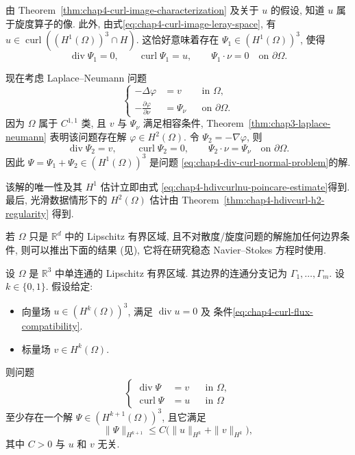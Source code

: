 \begin{Proof}
由 Theorem~\ref{thm:chap4-curl-image-characterization} 及关于 $u$ 的假设,
知道 $u$ 属于旋度算子的像. 此外, 由式\eqref{eq:chap4-curl-image-leray-space},
有 $u\in\operatorname{curl}((H^1(\Omega))^3\cap H)$. 这恰好意味着存在
$\Psi_1\in(H^1(\Omega))^3$, 使得
\[
\operatorname{div}\Psi_1=0,\qquad
\operatorname{curl}\Psi_1=u,\qquad
 \Psi_1\cdot\nu=0\quad\text{on }\partial\Omega.
\]

现在考虑 Laplace--Neumann 问题
\[
\left\{
\begin{aligned}
 -\Delta\varphi&=v&&\text{in }\Omega,\\
 -\frac{\partial\varphi}{\partial\nu}&=\Psi_\nu&&\text{on }\partial\Omega.
\end{aligned}
\right.
\]
因为 $\Omega$ 属于 $C^{1,1}$ 类, 且 $v$ 与 $\Psi_\nu$ 满足相容条件,
Theorem~\ref{thm:chap3-laplace-neumann}
表明该问题存在解 $\varphi\in H^2(\Omega)$. 令 $\Psi_2=-\nabla\varphi$, 则
\[
\operatorname{div}\Psi_2=v,\qquad
\operatorname{curl}\Psi_2=0,\qquad
 \Psi_2\cdot\nu=\Psi_\nu\quad\text{on }\partial\Omega.
\]
因此 $\Psi=\Psi_1+\Psi_2\in(H^1(\Omega))^3$ 是问题
\eqref{eq:chap4-div-curl-normal-problem}的解.

该解的唯一性及其 $H^1$ 估计立即由式
\eqref{eq:chap4-hdivcurlnu-poincare-estimate}得到. 最后, 光滑数据情形下的
$H^2(\Omega)$ 估计由 Theorem~\ref{thm:chap4-hdivcurl-h2-regularity} 得到.
\end{Proof}

若 $\Omega$ 只是 $\mathbb R^d$ 中的 Lipschitz 有界区域, 且不对散度/旋度问题的解施加任何边界条件,
则可以推出下面的结果 (见),
它将在研究稳态 Navier--Stokes 方程时使用.

\begin{Theorem}
\label{thm:chap4-vector-potential}
设 $\Omega$ 是 $\mathbb R^3$ 中单连通的 Lipschitz 有界区域. 其边界的连通分支记为
$\Gamma_1,\ldots,\Gamma_m$. 设 $k\in\{0,1\}$. 假设给定:
\begin{itemize}
 \item 向量场 $u\in(H^k(\Omega))^3$, 满足 $\operatorname{div}u=0$ 及
 条件\eqref{eq:chap4-curl-flux-compatibility}.
 \item 标量场 $v\in H^k(\Omega)$.
\end{itemize}
则问题
\[
\left\{
\begin{aligned}
 \operatorname{div}\Psi&=v&&\text{in }\Omega,\\
 \operatorname{curl}\Psi&=u&&\text{in }\Omega
\end{aligned}
\right.
\]
至少存在一个解 $\Psi\in(H^{k+1}(\Omega))^3$, 且它满足
\[
 \|\Psi\|_{H^{k+1}}\leq C\bigl(\|u\|_{H^k}+\|v\|_{H^k}\bigr),
\]
其中 $C>0$ 与 $u$ 和 $v$ 无关.
\end{Theorem}

